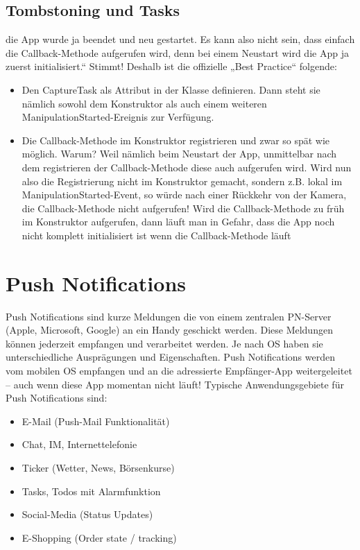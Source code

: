 \documentclass[a4paper,10pt]{scrreprt}
\begin{document}
\section{Tombstoning und Tasks}
die App wurde ja beendet und neu gestartet. Es kann also nicht sein, dass
einfach die Callback-Methode aufgerufen wird, denn bei einem Neustart wird die App ja zuerst initialisiert.“
Stimmt! Deshalb ist die offizielle „Best Practice“ folgende:
\begin{itemize}

\item Den CaptureTask als Attribut in der Klasse definieren. Dann steht sie nämlich sowohl dem Konstruktor
als auch einem weiteren ManipulationStarted-Ereignis zur Verfügung.
\item Die Callback-Methode im Konstruktor registrieren und zwar so spät wie möglich. Warum? Weil nämlich
beim Neustart der App, unmittelbar nach dem registrieren der Callback-Methode diese auch aufgerufen
wird. Wird nun also die Registrierung nicht im Konstruktor gemacht, sondern z.B. lokal im
ManipulationStarted-Event, so würde nach einer Rückkehr von der Kamera, die Callback-Methode nicht
aufgerufen!
Wird die Callback-Methode zu früh im Konstruktor aufgerufen, dann läuft man in Gefahr, dass die App
noch nicht komplett initialisiert ist wenn die Callback-Methode läuft

\end{itemize}

\chapter{Push Notifications}
Push Notifications sind kurze Meldungen die von einem zentralen PN-Server (Apple, Microsoft, Google) an ein
Handy geschickt werden. Diese Meldungen können jederzeit empfangen und verarbeitet werden. Je nach OS
haben sie unterschiedliche Ausprägungen und Eigenschaften. Push Notifications werden vom mobilen OS
empfangen und an die adressierte Empfänger-App weitergeleitet – auch wenn diese App momentan nicht läuft!
Typische Anwendungsgebiete für Push Notifications sind:
\begin{itemize}
 \item E-Mail (Push-Mail Funktionalität)
\item Chat, IM, Internettelefonie
\item Ticker (Wetter, News, Börsenkurse)
\item Tasks, Todos mit Alarmfunktion
\item Social-Media (Status Updates)
\item E-Shopping (Order state / tracking)
\end{itemize}
\end{document}
